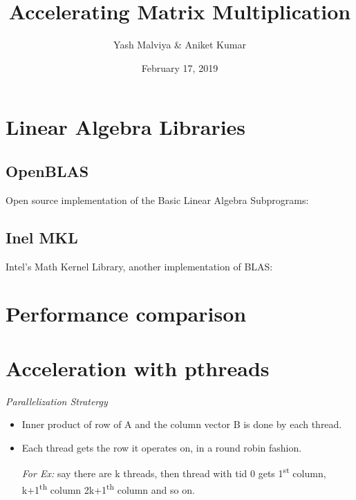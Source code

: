 \documentclass{article}
\author{Yash Malviya \& Aniket Kumar}
\title{Accelerating Matrix Multiplication}
\date{February 17, 2019}
\begin{document}
\maketitle

\section{Linear Algebra Libraries}

\subsection{OpenBLAS}

Open source implementation of the 
Basic Linear Algebra Subprograms: \textcite{OpenBLAS:wiki} 

\subsection{Inel MKL}

Intel's Math Kernel Library, another 
implementation of BLAS: \textcite{IntelMKL:doc}

\section{Performance comparison}

\section{Acceleration with pthreads}

\emph{Parallelization Stratergy}

\begin{itemize}
    \item Inner product of row of A and the column vector B 
    is done by each thread.

    \item Each thread gets the row it operates on, in a 
    round robin fashion. 
    
    \textit{For Ex:} say there are k threads, then thread with 
    tid 0 gets 1\textsuperscript{st} column, k+1\textsuperscript{th} 
    column 2k+1\textsuperscript{th} column and so on.


\end{itemize}

\printbibliography
\end{document}

